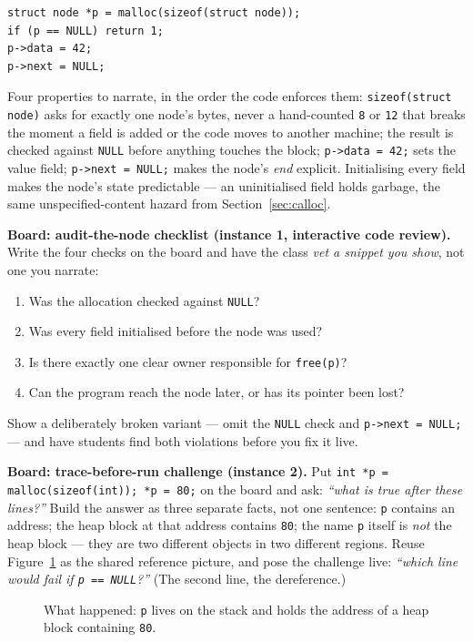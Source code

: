 \documentclass[11pt]{article}
\begin{document}
\begin{verbatim}
struct node *p = malloc(sizeof(struct node));
if (p == NULL) return 1;
p->data = 42;
p->next = NULL;
\end{verbatim}
Four properties to narrate, in the order the code enforces them: \texttt{sizeof(struct node)} asks for exactly one node's bytes, never a hand-counted \texttt{8} or \texttt{12} that breaks the moment a field is added or the code moves to another machine; the result is checked against \texttt{NULL} before anything touches the block; \texttt{p->data = 42;} sets the value field; \texttt{p->next = NULL;} makes the node's \emph{end} explicit. Initialising every field makes the node's state predictable --- an uninitialised field holds garbage, the same unspecified-content hazard from Section~\ref{sec:calloc}.

\textbf{Board: audit-the-node checklist (instance 1, interactive code review).} Write the four checks on the board and have the class \emph{vet a snippet you show}, not one you narrate:
\begin{enumerate}
  \item Was the allocation checked against \texttt{NULL}?
  \item Was every field initialised before the node was used?
  \item Is there exactly one clear owner responsible for \texttt{free(p)}?
  \item Can the program reach the node later, or has its pointer been lost?
\end{enumerate}
Show a deliberately broken variant --- omit the \texttt{NULL} check and \texttt{p->next = NULL;} --- and have students find both violations before you fix it live.

\textbf{Board: trace-before-run challenge (instance 2).} Put \texttt{int *p = malloc(sizeof(int)); *p = 80;} on the board and ask: \emph{``what is true after these lines?''} Build the answer as three separate facts, not one sentence: \texttt{p} contains an address; the heap block at that address contains \texttt{80}; the name \texttt{p} itself is \emph{not} the heap block --- they are two different objects in two different regions. Reuse Figure~\ref{fig:happened} as the shared reference picture, and pose the challenge live: \emph{``which line would fail if \texttt{p == NULL}?''} (The second line, the dereference.)

\begin{figure}[h]
  \centering
  \caption{What happened: \texttt{p} lives on the stack and holds the address
  of a heap block containing \texttt{80}.}
  \label{fig:happened}
\end{figure}
\end{document}
